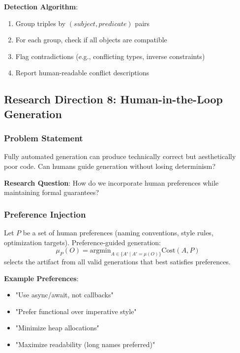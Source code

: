 \textbf{Detection Algorithm}:
\begin{enumerate}
    \item Group triples by $(subject, predicate)$ pairs
    \item For each group, check if all objects are compatible
    \item Flag contradictions (e.g., conflicting types, inverse constraints)
    \item Report human-readable conflict descriptions
\end{enumerate}

\subsection{Research Direction 8: Human-in-the-Loop Generation}

\subsubsection{Problem Statement}

Fully automated generation can produce technically correct but aesthetically poor code. Can humans guide generation without losing determinism?

\textbf{Research Question}: How do we incorporate human preferences while maintaining formal guarantees?

\subsubsection{Preference Injection}

\begin{definition}
    Let $P$ be a set of human preferences (naming conventions, style rules, optimization targets). Preference-guided generation:
    \begin{equation}
        \mu_P(O) = \text{argmin}_{A \in \{A' \mid A' = \mu(O)\}} \text{Cost}(A, P)
    \end{equation}
    selects the artifact from all valid generations that best satisfies preferences.
\end{definition}

\textbf{Example Preferences}:
\begin{itemize}
    \item "Use async/await, not callbacks"
    \item "Prefer functional over imperative style"
    \item "Minimize heap allocations"
    \item "Maximize readability (long names preferred)"
\end{itemize}

